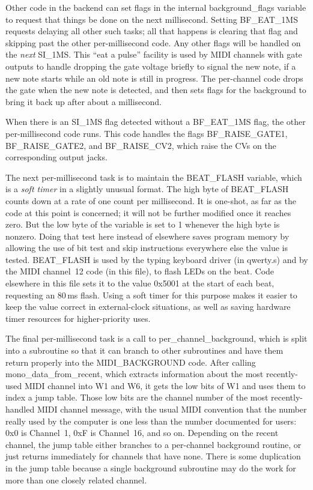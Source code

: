 Other code in the backend can set flags in the internal background\_flags
variable to request that things be done on the next millisecond.  Setting
BF\_EAT\_1MS requests delaying all other such tasks; all that happens is
clearing that flag and skipping past the other per-millisecond code.  Any
other flags will be handled on the \emph{next} SI\_1MS.  This ``eat a
pulse'' facility is used by MIDI channels with gate outputs to handle
dropping the gate voltage briefly to signal the new note, if a new note
starts while an old note is still in progress.  The per-channel code drops
the gate when the new note is detected, and then sets flags for the
background to bring it back up after about a millisecond.

When there is an SI\_1MS flag detected without a BF\_EAT\_1MS flag, the
other per-millisecond code runs.  This code handles the flags
BF\_RAISE\_GATE1, BF\_RAISE\_GATE2, and BF\_RAISE\_CV2, which raise the CVs
on the corresponding output jacks.

The next per-millisecond task is to maintain the BEAT\_FLASH variable,
which is a \emph{soft timer} in a slightly unusual format.  The high
byte of BEAT\_FLASH counts down at a rate of one count per millisecond.  It
is one-shot, as far as the code at this point is concerned; it will not be
further modified once it reaches zero.  But the low byte of the
variable is set to 1 whenever the high byte is nonzero.  Doing that test
here instead of elsewhere saves program memory by allowing the use of bit
test and skip instructions everywhere else the value is tested.  BEAT\_FLASH
is used by the typing keyboard driver (in qwerty.s) and by the MIDI
channel~12 code (in this file), to flash LEDs on the beat.  Code elsewhere
in this file sets it to the value 0x5001 at the start of each beat,
requesting an 80\,ms flash.  Using a soft timer for this purpose makes it
easier to keep the value correct in external-clock situations, as well as
saving hardware timer resources for higher-priority uses.

The final per-millisecond task is a call to per\_channel\_background, which
is split into a subroutine so that it can branch to other subroutines and
have them return properly into the MIDI\_BACKGROUND code.  After calling
mono\_data\_from\_recent, which extracts information about the most
recently-used MIDI channel into W1 and W6, it gets the low bits of W1 and
uses them to index a jump table.  Those low bits are the channel number of
the most recently-handled MIDI channel message, with the usual MIDI
convention that the number really used by the computer is one less than the
number documented for users: 0x0 is Channel~1, 0xF is Channel~16, and so on. 
Depending on the recent channel, the jump table either branches to a
per-channel background routine, or just returns immediately for channels
that have none.  There is some duplication in the jump table because a
single background subroutine may do the work for more than one closely
related channel.

